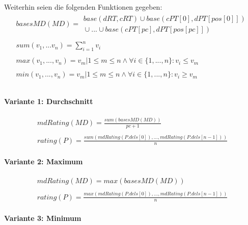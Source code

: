 \documentclass[a4paper,12pt]{article}
\begin{document}
Weiterhin seien die folgenden Funktionen gegeben:
\begin{gather*}
\mathit{basesMD(MD)} =  
				\begin{array}{l}
					  \mathit{base(dRT, cRT)} \mathit{ }\cup \mathit{base(cPT[0],dPT[pos[0]])} \\
					  \mathit{ }\cup ... \cup \mathit{base(cPT[pc],dPT[pos[pc]])}
				\end{array}    
				\\\\
				\mathit{sum(v_1,...v_n)} = \sum_{i=1}^{n}v_i
\\\\         
\mathit{max(v_1,...,v_n)} = v_{m}| 1 \leq m \leq n  \wedge \forall i \in  \{1,...,n\}: v_i \leq v_{m}
\\\\       
\mathit{min(v_1,...,v_n)} = v_{m}| 1 \leq m \leq n  \wedge \forall i \in  \{1,...,n\}: v_i \geq v_{m}
\\\\    
\end{gather*}



\paragraph{Variante 1: Durchschnitt}

\begin{gather*}
\mathit{mdRating(MD)} = \frac{\mathit{sum(basesMD(MD))}}{\mathit{pc} + 1}
\\\\
\mathit{rating(P)} = \frac{ \mathit{sum(mdRating(P.dels[0]),...,mdRating(P.dels[n-1]))}}{n}
\end{gather*}



\paragraph{Variante 2: Maximum}

\begin{gather*}
\mathit{mdRating(MD)} = \mathit{max(basesMD(MD))}
\\\\
\mathit{rating(P)} = \frac{\mathit{max(mdRating(P.dels[0]),...,mdRating(P.dels[n-1]))}}{n}
\end{gather*}



\paragraph{Variante 3: Minimum}
\end{document}
